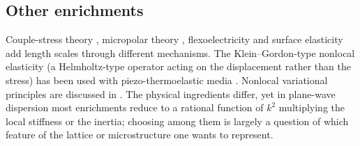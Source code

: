 \subsection{Other enrichments}
Couple-stress theory \citep{MindlinTiersten1962}, micropolar theory \citep{Eringen1966a,Eringen1999}, flexoelectricity and surface elasticity add length scales through different mechanisms. The Klein--Gordon-type nonlocal elasticity \citep{Lazar2022} (a Helmholtz-type operator acting on the displacement rather than the stress) has been used with piezo-thermoelastic media \citep{Das2026}. Nonlocal variational principles are discussed in \citep{Polizzotto2001}. The physical ingredients differ, yet in plane-wave dispersion most enrichments reduce to a rational function of $k^2$ multiplying the local stiffness or the inertia; choosing among them is largely a question of which feature of the lattice or microstructure one wants to represent.

